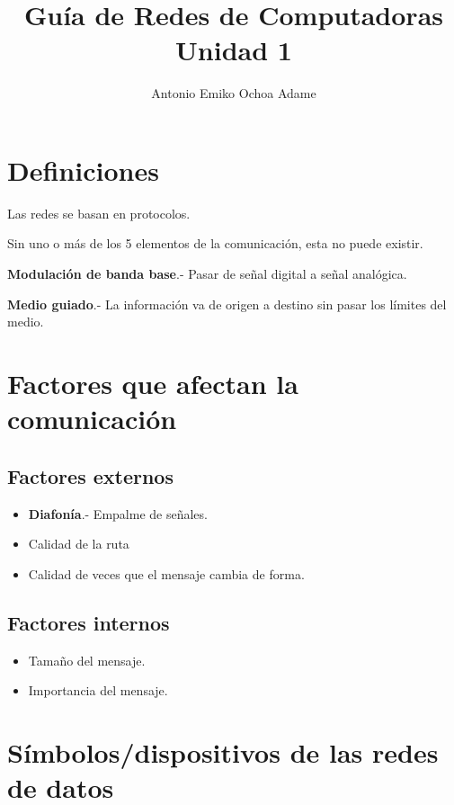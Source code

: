 \documentclass{article}
\begin{document}
\title{Guía de Redes de Computadoras Unidad 1}
\author{Antonio Emiko Ochoa Adame}
\maketitle

\section{Definiciones}

Las redes se basan en protocolos.
\vspace{1em}

Sin uno o más de los 5 elementos de la comunicación, esta no puede existir.
\vspace{1em}

\textbf{Modulación de banda base}.- Pasar de señal digital a señal analógica.
\vspace{1em}

\textbf{Medio guiado}.- La información va de origen a destino sin pasar los
límites del medio.

\section{Factores que afectan la comunicación}

\subsection{Factores externos}

\begin{itemize}
	\item
	\textbf{Diafonía}.- Empalme de señales.
	\item
	Calidad de la ruta
	\item
	Calidad de veces que el mensaje cambia de forma.
\end{itemize}

\subsection{Factores internos}

\begin{itemize}
	\item
	Tamaño del mensaje.
	\item
	Importancia del mensaje.
\end{itemize}

\section{Símbolos/dispositivos de las redes de datos}
\end{document}

